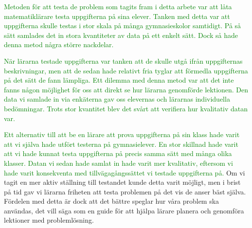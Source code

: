 \textcolor{green}{Metoden för att testa de problem som tagits fram i detta arbete var att låta matematiklärare testa uppgifterna på sina elever. Tanken med detta var att uppgifterna skulle testas i stor skala på många gymnasieskolor samtidigt. På så sätt samlades det in stora kvantiteter av data på ett enkelt sätt. Dock så hade denna metod några större nackdelar.}

\textcolor{green}{När lärarna testade uppgifterna var tanken att de skulle utgå ifrån uppgifternas beskrivningar, men att de sedan hade relativt fria tyglar att förmedla uppgifterna på det sätt de fann lämpliga. Ett dilemma med denna metod var att det inte fanns någon möjlighet för oss att direkt se hur lärarna genomförde lektionen. Den data vi samlade in via enkäterna gav oss elevernas och lärarnas individuella bedömningar. Trots stor kvantitet blev det svårt att verifiera hur kvalitativ datan var.}

\textcolor{green}{Ett alternativ till att be en lärare att prova uppgifterna på sin klass hade varit att vi själva hade utfört testerna på gymnasielever. En stor skillnad hade varit att vi hade kunnat testa uppgifterna på precis samma sätt med många olika klasser. Datan vi sedan hade samlat in hade varit mer kvalitativ, eftersom vi hade varit konsekventa med tillvägagångssättet vi testade uppgifterna på.}
    \textcolor{WildStrawberry}{
    Om vi tagit en mer aktiv ställning till testandet kunde detta varit möjligt, men i brist på tid gav vi lärarna friheten att testa problemen på det vis de anser bäst själva.} \textcolor{lila}{Fördelen med detta är dock att det bättre speglar hur våra problem ska användas, det vill säga som en guide för att hjälpa lärare  planera och genomföra lektioner med problemlösning.}


%
% 
%
% 
%